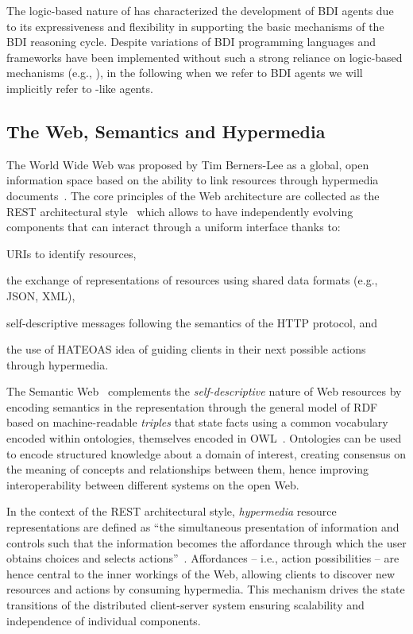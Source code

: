 \documentclass[
]{ceurart}
\begin{document}
The logic-based nature of \agentspeak{} has characterized the development of \ac{BDI} agents due to its expressiveness and flexibility in supporting the basic mechanisms of the \ac{BDI} reasoning cycle.
%
Despite variations of \ac{BDI} programming languages and frameworks have been implemented without such a strong reliance on logic-based mechanisms (e.g., \cite{map2005sp,kampik2019emas}), in the following when we refer to \ac{BDI} agents we will implicitly refer to \agentspeak{}-like agents.

\subsection{The Web, Semantics and Hypermedia}

The World Wide Web was proposed by Tim Berners-Lee as a global, open information space
based on the ability to link resources through hypermedia documents~\cite{DBLP:journals/cn/Berners-LeeCG92}.
%
The core principles of the Web architecture are collected as the \ac{REST} architectural style~\cite{DBLP:journals/toit/FieldingT02}
which allows to have independently evolving components
that can interact through a uniform interface thanks to:
\begin{inlinelist}
  \item \acp{URI} to identify resources,
  \item the exchange of representations of resources using shared data formats (e.g., JSON, XML),
  \item self-descriptive messages following the semantics of the HTTP protocol, and
  \item the use of \ac{HATEOAS} idea of guiding clients in their next possible actions through hypermedia.
\end{inlinelist}

The Semantic Web~\cite{BernersLee2001} complements the \emph{self-descriptive} nature of Web resources
by encoding semantics in the representation through the general model of \ac{RDF}~\cite{RDF_Concepts_W3C:14}
based on machine-readable \emph{triples}
that state facts using a common vocabulary encoded within ontologies, themselves encoded in {OWL}~\cite{OWL_Syntax_W3C:12}.
%
Ontologies can be used to encode structured knowledge about a domain of interest, creating consensus on the meaning of concepts and relationships between them, hence improving interoperability between different systems on the open Web.

In the context of the \ac{REST} architectural style, \emph{hypermedia} resource representations are defined as ``the simultaneous presentation of information and controls such that the information becomes the affordance through which the user obtains choices and selects actions''~\cite{DBLP:journals/toit/FieldingT02}.
%
Affordances
-- i.e., action possibilities --
are hence central to the inner workings of the Web,
allowing clients to discover new resources and actions by consuming hypermedia.
This mechanism drives the state transitions of the distributed client-server system
ensuring scalability and independence of individual components.
\end{document}
